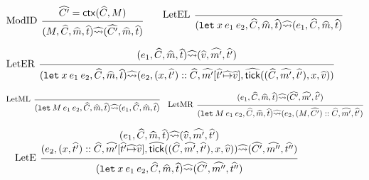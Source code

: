 \documentclass{article}
\theoremstyle{definition}
\newcommand*{\cons}{::}
\newcommand*{\A}[1]{\widehat{#1}}
\newcommand*{\mem}{m}
\newcommand*{\semarrow}{\rightsquigarrow}
\newcommand*{\tick}{\mathsf{tick}}
\newcommand*{\modctx}{\mathsf{ctx}}
\begin{document}
\begin{figure}[h!]
  \[
    \begin{prooftree}
      \hypo{\A{C'}=\modctx(\A{C},M)}
      \infer[left label=ModID]1{
      (M, \A{C}, \A\mem, \A{t})
      \A\semarrow
      (\A{C'}, \A\mem, \A{t})
      }
    \end{prooftree}\qquad
    \begin{prooftree}
      \infer[left label=LetEL]0{
      (\mathtt{let}\:x\:e_1\:e_2, \A{C}, \A\mem, \A{t})
      \A\semarrow
      (e_{1}, \A{C}, \A\mem, \A{t})
      }
    \end{prooftree}
  \]

  \[
    \begin{prooftree}
      \hypo{
        \begin{matrix}
          (e_{1}, \A{C}, \A\mem, \A{t})
          \A\semarrow
          (\A{v}, \A{\mem'}, \A{t'})
        \end{matrix}
      }
      \infer[left label=LetER]1{
      (\mathtt{let}\:x\:e_1\:e_2, \A{C}, \A\mem, \A{t})
      \A\semarrow
      (e_{2}, (x, \A{t'})\cons \A{C}, \A{\mem'}[\A{t'}\A\mapsto \A{v}], \A\tick((\A{C},\A{\mem'},\A{t'}),x,\A{v}))
      }
    \end{prooftree}
  \]

  \[
    \begin{prooftree}
      \infer[left label=LetML]0{
      (\mathtt{let}\:M\:e_{1}\:e_{2}, \A{C}, \A\mem, \A{t})
      \A\semarrow
      (e_{1}, \A{C}, \A\mem, \A{t})
      }
    \end{prooftree}\quad
    \begin{prooftree}
      \hypo{
        \begin{matrix}
          (e_{1}, \A{C}, \A\mem, \A{t})
          \A\semarrow
          (\A{C'}, \A{\mem'}, \A{t'})
        \end{matrix}
      }
      \infer[left label=LetMR]1{
      (\mathtt{let}\:M\:e_{1}\:e_{2}, \A{C}, \A\mem, \A{t})
      \A\semarrow
      (e_{2}, (M, \A{C'})\cons \A{C}, \A{\mem'}, \A{t'})
      }
    \end{prooftree}
  \]

  \[
    \begin{prooftree}
      \hypo{
        \begin{matrix}
          (e_{1}, \A{C}, \A\mem, \A{t})
          \A\semarrow
          (\A{v}, \A{\mem'}, \A{t'}) \\
          (e_{2}, (x, \A{t'})\cons \A{C}, \A{\mem'}[\A{t'}\A\mapsto \A{v}], \A\tick((\A{C},\A{\mem'},\A{t'}),x,\A{v}))
          \A\semarrow
          (\A{C'}, \A{\mem''}, \A{t''})
        \end{matrix}
      }
      \infer[left label=LetE]1{
      (\mathtt{let}\:x\:e_1\:e_2, \A{C}, \A\mem, \A{t})
      \A\semarrow
      (\A{C'}, \A{\mem''}, \A{t''})
      }
    \end{prooftree}
  \]


\end{figure}
\end{document}
